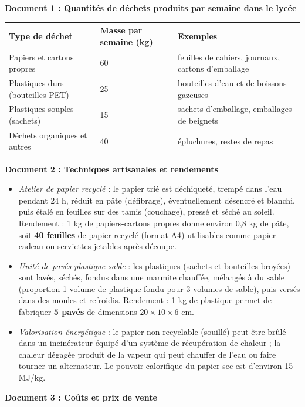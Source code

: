 \documentclass[11pt]{article}
\begin{document}
\textbf{Document 1 : Quantités de déchets produits par semaine dans le lycée}

\begin{center}
\begin{tabularx}{\linewidth}{|l|X|X|}\hline
\rowcolor{popblueL} \textbf{Type de déchet} & \textbf{Masse par semaine (kg)} & \textbf{Exemples} \\ \hline
Papiers et cartons propres & 60 & feuilles de cahiers, journaux, cartons d'emballage \\ \hline
Plastiques durs (bouteilles PET) & 25 & bouteilles d'eau et de boissons gazeuses \\ \hline
Plastiques souples (sachets) & 15 & sachets d'emballage, emballages de beignets \\ \hline
Déchets organiques et autres & 40 & épluchures, restes de repas \\ \hline
\end{tabularx}
\end{center}

\textbf{Document 2 : Techniques artisanales et rendements}

\begin{itemize}
\item \emph{Atelier de papier recyclé} : le papier trié est déchiqueté, trempé dans l'eau pendant 24 h, réduit en pâte (défibrage), éventuellement désencré et blanchi, puis étalé en feuilles sur des tamis (couchage), pressé et séché au soleil. Rendement : 1 kg de papiers-cartons propres donne environ 0,8 kg de pâte, soit \textbf{40 feuilles} de papier recyclé (format A4) utilisables comme papier-cadeau ou serviettes jetables après découpe.
\item \emph{Unité de pavés plastique-sable} : les plastiques (sachets et bouteilles broyées) sont lavés, séchés, fondus dans une marmite chauffée, mélangés à du sable (proportion 1 volume de plastique fondu pour 3 volumes de sable), puis versés dans des moules et refroidis. Rendement : 1 kg de plastique permet de fabriquer \textbf{5 pavés} de dimensions $20 \times 10 \times 6$ cm.
\item \emph{Valorisation énergétique} : le papier non recyclable (souillé) peut être brûlé dans un incinérateur équipé d'un système de récupération de chaleur ; la chaleur dégagée produit de la vapeur qui peut chauffer de l'eau ou faire tourner un alternateur. Le pouvoir calorifique du papier sec est d'environ 15 MJ/kg.
\end{itemize}

\textbf{Document 3 : Coûts et prix de vente}
\end{document}
